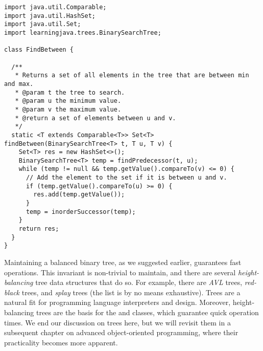 \enlargethispage{1\baselineskip}
\begin{lstlisting}[language=MyJava]
import java.util.Comparable;
import java.util.HashSet;
import java.util.Set;
import learningjava.trees.BinarySearchTree;

class FindBetween {

  /**
   * Returns a set of all elements in the tree that are between min and max.
   * @param t the tree to search.
   * @param u the minimum value.
   * @param v the maximum value.
   * @return a set of elements between u and v.
   */
  static <T extends Comparable<T>> Set<T> findBetween(BinarySearchTree<T> t, T u, T v) {
    Set<T> res = new HashSet<>();
    BinarySearchTree<T> temp = findPredecessor(t, u);
    while (temp != null && temp.getValue().compareTo(v) <= 0) {
      // Add the element to the set if it is between u and v.
      if (temp.getValue().compareTo(u) >= 0) {
        res.add(temp.getValue());
      }
      temp = inorderSuccessor(temp);
    }
    return res;
  }
}
\end{lstlisting}

Maintaining a balanced binary tree, as we suggested earlier, guarantees fast operations. 
This invariant is non-trivial to maintain, and there are several \emph{height-balancing} tree data structures that do so. 
For example, there are \emph{AVL} trees, \emph{red-black} trees, and \emph{splay} trees (the list is by no means exhaustive). 
Trees are a natural fit for programming language interpreters and design. Moreover, height-balancing trees are the basis for the  and  classes, which guarantee quick operation times.
We end our discussion on trees here, but we will revisit them in a subsequent chapter on advanced object-oriented programming, where their practicality becomes more apparent.